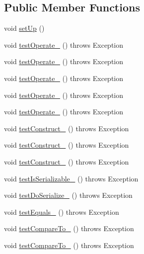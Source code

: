 \subsection*{Public Member Functions}
\begin{DoxyCompactItemize}
\item 
void \hyperlink{classorg_1_1jgap_1_1impl_1_1_averaging_crossover_operator_test_a846870fb31f8e692c810f97515104a78}{set\-Up} ()
\item 
void \hyperlink{classorg_1_1jgap_1_1impl_1_1_averaging_crossover_operator_test_a9482a07a4e269489611bde38d55f5343}{test\-Operate\-\_} ()  throws Exception 
\item 
void \hyperlink{classorg_1_1jgap_1_1impl_1_1_averaging_crossover_operator_test_aa2df872526cbc34c707f0597b55171d0}{test\-Operate\-\_} ()  throws Exception 
\item 
void \hyperlink{classorg_1_1jgap_1_1impl_1_1_averaging_crossover_operator_test_aea721bcd9f97d7e05e0df42f75e022b8}{test\-Operate\-\_} ()  throws Exception 
\item 
void \hyperlink{classorg_1_1jgap_1_1impl_1_1_averaging_crossover_operator_test_aa9990fa94a49428fb957ac1b6f8991ce}{test\-Operate\-\_} ()  throws Exception 
\item 
void \hyperlink{classorg_1_1jgap_1_1impl_1_1_averaging_crossover_operator_test_a10b7f54f4998e2b5128a0164ec373b0b}{test\-Operate\-\_} ()  throws Exception 
\item 
void \hyperlink{classorg_1_1jgap_1_1impl_1_1_averaging_crossover_operator_test_aa090cc1ef25b8ee6bbc99e692ef255f7}{test\-Construct\-\_} ()  throws Exception 
\item 
void \hyperlink{classorg_1_1jgap_1_1impl_1_1_averaging_crossover_operator_test_a1b5f792bc78559ad0ffc4c00fc7b4db9}{test\-Construct\-\_} ()  throws Exception 
\item 
void \hyperlink{classorg_1_1jgap_1_1impl_1_1_averaging_crossover_operator_test_a5640cc05f419f245521a3604ab3c81db}{test\-Construct\-\_} ()  throws Exception 
\item 
void \hyperlink{classorg_1_1jgap_1_1impl_1_1_averaging_crossover_operator_test_a9a45283b2533d998b8639e5760286ea7}{test\-Is\-Serializable\-\_} ()  throws Exception 
\item 
void \hyperlink{classorg_1_1jgap_1_1impl_1_1_averaging_crossover_operator_test_a4e481c26cbb2c65621367071bd1faf8c}{test\-Do\-Serialize\-\_} ()  throws Exception 
\item 
void \hyperlink{classorg_1_1jgap_1_1impl_1_1_averaging_crossover_operator_test_adab982698024fbd7d8a9fdb131675d32}{test\-Equals\-\_} ()  throws Exception 
\item 
void \hyperlink{classorg_1_1jgap_1_1impl_1_1_averaging_crossover_operator_test_a57d8ec0cb85663631cc701dde3246cd8}{test\-Compare\-To\-\_} ()  throws Exception 
\item 
void \hyperlink{classorg_1_1jgap_1_1impl_1_1_averaging_crossover_operator_test_ab6b2bb631ac9f5825391f76aad6587f7}{test\-Compare\-To\-\_} ()  throws Exception 
\end{DoxyCompactItemize}
